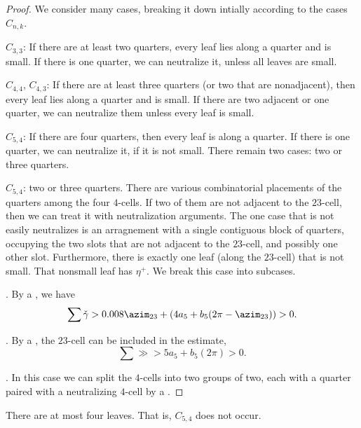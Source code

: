 \begin{proof} We consider many cases, breaking it down intially according to the cases $C_{n,k}$.

$C_{3,3}$:  If there are at least two quarters, every leaf lies along a quarter and is small.
If there is one quarter, we can neutralize it, unless all leaves are small.

$C_{4,4}$, $C_{4,3}$: If there are at least three quarters (or two that are nonadjacent), then every leaf lies along a quarter
and is small.  If there are two adjacent or one quarter, we can neutralize them unless every leaf is small.

$C_{5,4}$: If there are four quarters, then every leaf is along a quarter.
If there is one quarter, we can neutralize it, if it is not small.
There remain two cases: two or three quarters.

$C_{5,4}$: two or three quarters.  There are various combinatorial placements of the quarters among the four $4$-cells.  If two of them are not adjacent to the $23$-cell, then we can treat it with neutralization arguments.  The one case that is not easily neutralizes is an arragnement with a single contiguous block of quarters, occupying the two slots that are not adjacent to the $23$-cell, and possibly one other slot.  Furthermore, there is exactly one leaf (along the $23$-cell) that is not small.   That nonsmall leaf has $\eta^+$.  We break this case into subcases.

.  By a , we have
\[
\sum \gg > 0.008 \azim_{23} + (4 a_5 + b_5 (2\pi-\azim_{23})) > 0.
\]

.
By a , the $23$-cell can be included in the estimate,
\[
\sum \gg > 5 a_5 + b_5 (2\pi) > 0.
\]

.
In this case we can split the $4$-cells into two groups of two, each with
a quarter paired with a neutralizing $4$-cell by a .
\end{proof}

\begin{lemma}  There are at most four leaves.  That is, $C_{5,4}$ does not occur.
\end{lemma}

